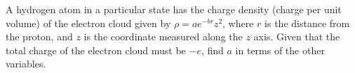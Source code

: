 A hydrogen atom in a particular state has the charge density (charge per unit volume)
of the electron cloud given by $\rho=ae^{-br}z^2$, where $r$ is the distance from the
proton, and $z$ is the coordinate measured along the $z$ axis. Given that the total
charge of the electron cloud must be $-e$, find $a$ in terms of the other variables.\answercheck
